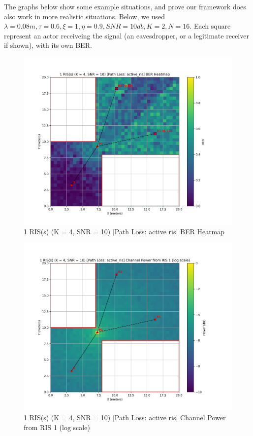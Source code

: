 The graphs below show some example situations, and prove our framework does also work in more realistic situations. Below, we used $\lambda = 0.08m, \tau = 0.6, \xi = 1, \eta = 0.9, SNR = 10db, K = 2, N = 16$. Each square represent an actor receiveing the signal (an eavesdropper, or a legitimate receiver if shown), with its own BER.

\newpage


\begin{figure}[H]
  \centering
  \includegraphics[width=0.8\linewidth]{imgs/heatmap-simulations/1 RIS(s) (K = 4, SNR = 10) [Path Loss_ active_ris] BER Heatmap.png}
  \caption{1 RIS(s) (K = 4, SNR = 10) [Path Loss: active ris] BER Heatmap}
\end{figure}

\begin{figure}[H]
  \centering
  \includegraphics[width=0.8\linewidth]{imgs/heatmap-simulations/1 RIS(s) (K = 4, SNR = 10) [Path Loss_ active_ris] Channel Power from RIS 1 (log scale).png}
  \caption{1 RIS(s) (K = 4, SNR = 10) [Path Loss: active ris] Channel Power from RIS 1 (log scale)}
\end{figure}

